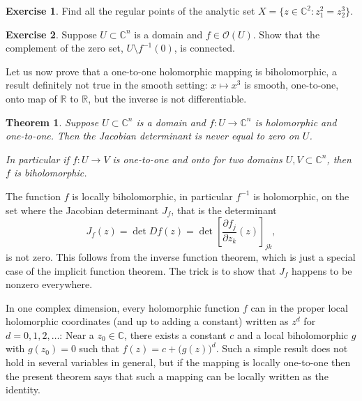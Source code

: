 \documentclass[12pt,openany]{book}
\newcommand{\C}{{\mathbb{C}}}
\newcommand{\R}{{\mathbb{R}}}
\newcommand{\sO}{{\mathscr{O}}}
\theoremstyle{plain}
\newtheorem{thm}{Theorem}[section]
\theoremstyle{remark}
\theoremstyle{definition}
\newenvironment{exbox}{%
    \def\FrameCommand{\vrule width 1pt \relax\hspace {10pt}}%
    \MakeFramed {\advance \hsize -\width \FrameRestore }%
}{%
    \endMakeFramed
}
\theoremstyle{exercise}
\newtheorem{exercise}{Exercise}[section]
\theoremstyle{example}
\begin{document}
\begin{exbox}
\begin{exercise}
Find all the regular points of the analytic set
$X = \bigl\{ z \in \C^2 : z_1^2 = z_2^3 \bigr\}$.
\end{exercise}

\begin{exercise} \label{exercise:connectedcomplement}
Suppose $U \subset \C^n$ is a domain and $f \in \sO(U)$.
Show that the complement of the zero set, $U \setminus f^{-1}(0)$, is
connected.
\end{exercise}
\end{exbox}

Let us now prove that a one-to-one holomorphic
mapping is biholomorphic, a result definitely not true in the
smooth setting: $x \mapsto x^3$ is smooth, one-to-one, onto map
of $\R$ to $\R$, but the inverse is not differentiable.

\begin{thm} \label{thm:injective}
Suppose $U \subset \C^n$ is a domain and $f \colon U \to \C^n$ is
holomorphic and one-to-one.  Then the Jacobian determinant is never equal to zero 
on $U$.

In particular if $f \colon U \to V$ is
one-to-one and onto for two domains $U,V \subset \C^n$, then $f$ is
biholomorphic.
\end{thm}

The function $f$ is locally biholomorphic, in particular
$f^{-1}$ is holomorphic,
on the set where the Jacobian determinant $J_f$, that is the determinant
\begin{equation*}
J_f(z) = \det Df(z) = \det \left[ \frac{\partial f_j}{\partial z_k}(z)
\right]_{jk} ,
\end{equation*}
is not zero.  This follows from the inverse function theorem, which is just
a special case of the implicit function theorem.
The trick is to show that $J_f$ happens to be nonzero
everywhere.

In one complex dimension, every holomorphic function $f$ can in
the proper local holomorphic coordinates (and up to adding a constant)
written as $z^d$ for $d=0,1,2,\ldots$:
Near a $z_0 \in \C$,
there exists a constant $c$ and a local biholomorphic $g$
with $g(z_0) = 0$ such that
$f(z) = c + {\bigl( g(z) \bigr)}^d$.
Such a simple result
does not hold in several variables in general, but if the mapping is
locally one-to-one then the present theorem says that such a mapping can be
locally written as the identity.
\end{document}
